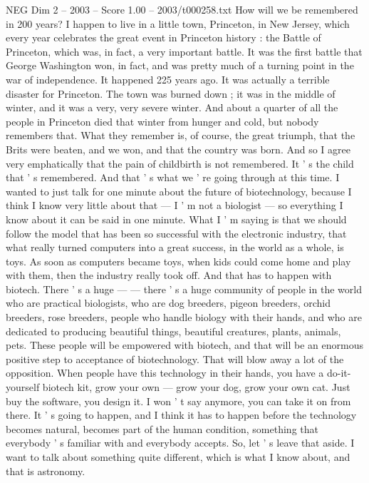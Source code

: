 \begin{textsample}{NEG Dim 2 – 2003 – Score 1.00 – 2003/t000258.txt}  \label{ex:f2_neg_019}
How will we be remembered in 200 years?
I happen to live in a little town, Princeton, in New Jersey, which every year celebrates the great event in Princeton history : the Battle of Princeton, which was, in fact, a very important battle.
It was the first battle that George Washington won, in fact, and was pretty much of a turning point in the war of independence.
It happened 225 years ago.
It was actually a terrible disaster for Princeton.
The town was burned down ; it was in the middle of winter, and it was a very, very severe winter.
And about a quarter of all the people in Princeton died that winter from hunger and cold, but nobody remembers that.
What they remember is, of course, the great triumph, that the Brits were beaten, and we won, and that the country was born.
And so I agree very emphatically that the pain of childbirth is not remembered.
It ' s the child that ' s remembered.
And that ' s what we ' re going through at this time.
I wanted to just talk for one minute about the future of biotechnology, because I think I know very little about that — I ' m not a biologist — so everything I know about it can be said in one minute.
What I ' m saying is that we should follow the model that has been so successful with the electronic industry, that what really turned computers into a great success, in the world as a whole, is toys.
As soon as computers became toys, when kids could come home and play with them, then the industry really took off.
And that has to happen with biotech.
There ' s a huge — — there ' s a huge community of people in the world who are practical biologists, who are dog breeders, pigeon breeders, orchid breeders, rose breeders, people who handle biology with their hands, and who are dedicated to producing beautiful things, beautiful creatures, plants, animals, pets.
These people will be empowered with biotech, and that will be an enormous positive step to acceptance of biotechnology.
That will blow away a lot of the opposition.
When people have this technology in their hands, you have a do-it-yourself biotech kit, grow your own — grow your dog, grow your own cat.
Just buy the software, you design it.
I won ' t say anymore, you can take it on from there.
It ' s going to happen, and I think it has to happen before the technology becomes natural, becomes part of the human condition, something that everybody ' s familiar with and everybody accepts.
So, let ' s leave that aside.
I want to talk about something quite different, which is what I know about, and that is astronomy.

\end{textsample}
